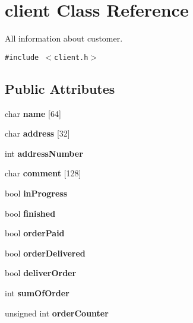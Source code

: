 \hypertarget{classclient}{
\section{client Class Reference}
\label{classclient}
}
All information about customer.  


{\tt \#include $<$client.h$>$}

\subsection*{Public Attributes}
\begin{CompactItemize}
\item 
\hypertarget{classclient_275f6727040426992bb1c8e247d38cde}{
char {\bf name} \mbox{[}64\mbox{]}}
\label{classclient_275f6727040426992bb1c8e247d38cde}

\item 
\hypertarget{classclient_06a8d016fa013b9fc60bcc24da937701}{
char {\bf address} \mbox{[}32\mbox{]}}
\label{classclient_06a8d016fa013b9fc60bcc24da937701}

\item 
\hypertarget{classclient_6ab3066cc6893cf6833b2871ecdebaf2}{
int {\bf address\-Number}}
\label{classclient_6ab3066cc6893cf6833b2871ecdebaf2}

\item 
\hypertarget{classclient_34824e2772f77c71f2d3778354d68b1c}{
char {\bf comment} \mbox{[}128\mbox{]}}
\label{classclient_34824e2772f77c71f2d3778354d68b1c}

\item 
\hypertarget{classclient_292db71ff1a82008b52bc6f74bd0419e}{
bool {\bf in\-Progress}}
\label{classclient_292db71ff1a82008b52bc6f74bd0419e}

\item 
\hypertarget{classclient_a5d7ceb2c59b8cee46c2953fec9abc19}{
bool {\bf finished}}
\label{classclient_a5d7ceb2c59b8cee46c2953fec9abc19}

\item 
\hypertarget{classclient_8498e9222401c9034d4e5a26970a3400}{
bool {\bf order\-Paid}}
\label{classclient_8498e9222401c9034d4e5a26970a3400}

\item 
\hypertarget{classclient_63c4891c26137238d3075aa6a395c235}{
bool {\bf order\-Delivered}}
\label{classclient_63c4891c26137238d3075aa6a395c235}

\item 
\hypertarget{classclient_48e3b11844a6747c24de0ff69018f775}{
bool {\bf deliver\-Order}}
\label{classclient_48e3b11844a6747c24de0ff69018f775}

\item 
\hypertarget{classclient_89b86d03136dc2f044d7669137baf6b5}{
int {\bf sum\-Of\-Order}}
\label{classclient_89b86d03136dc2f044d7669137baf6b5}

\item 
\hypertarget{classclient_25f95fa8cae78c29d5fe90cb9879944a}{
unsigned int {\bf order\-Counter}}
\label{classclient_25f95fa8cae78c29d5fe90cb9879944a}

\end{CompactItemize}
